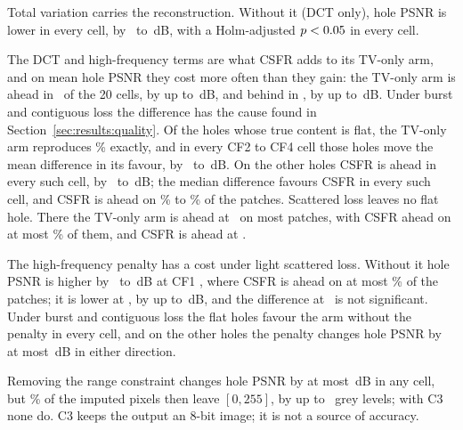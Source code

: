 \documentclass[final,3p]{elsarticle}
\begin{document}
Total variation carries the reconstruction. Without it (DCT only), hole PSNR is lower in every cell, by \ablNoTvMin\ to \ablNoTvMax\,dB, with a Holm-adjusted $p < 0.05$ in every cell.

The DCT and high-frequency terms are what CSFR adds to its TV-only arm, and on mean hole PSNR they cost more often than they gain: the TV-only arm is ahead in \ablTvNBehind\ of the 20 cells, by up to \ablTvBehindMax\,dB, and behind in \ablTvNAhead, by up to \ablTvAheadMax\,dB. Under burst and contiguous loss the difference has the cause found in Section~\ref{sec:results:quality}. Of the holes whose true content is flat, the TV-only arm reproduces \ablTvBcFlatCapShare\% exactly, and in every CF2 to CF4 cell those holes move the mean difference in its favour, by \ablTvBcFlatMin\ to \ablTvBcFlatMax\,dB. On the other holes CSFR is ahead in every such cell, by \ablTvBcRestMin\ to \ablTvBcRestMax\,dB; the median difference favours CSFR in every such cell, and CSFR is ahead on \ablTvBcAheadMin\% to \ablTvBcAheadMax\% of the patches. Scattered loss leaves no flat hole. There the TV-only arm is ahead at \ablTvScatterBehindLevels\ on most patches, with CSFR ahead on at most \ablTvScatterAheadShareMax\% of them, and CSFR is ahead at \ablTvScatterAheadLevels.

The high-frequency penalty has a cost under light scattered loss. Without it hole PSNR is higher by \ablNoFcScatterBehindMin\ to \ablNoFcScatterBehindMax\,dB at CF1 \ablNoFcScatterBehindLevels, where CSFR is ahead on at most \ablNoFcScatterAheadShareMax\% of the patches; it is lower at \ablNoFcScatterAheadLevels, by up to \ablNoFcScatterAheadMax\,dB, and the difference at \ablNoFcScatterNsLevels\ is not significant. Under burst and contiguous loss the flat holes favour the arm without the penalty in every cell, and on the other holes the penalty changes hole PSNR by at most \ablNoFcBcRestMaxAbs\,dB in either direction.

Removing the range constraint changes hole PSNR by at most \ablClipMaxAbs\,dB in any cell, but \ablClipShare\% of the imputed pixels then leave $[0, 255]$, by up to \ablClipMaxExcess\ grey levels; with C3 none do. C3 keeps the output an 8-bit image; it is not a source of accuracy.
\end{document}
